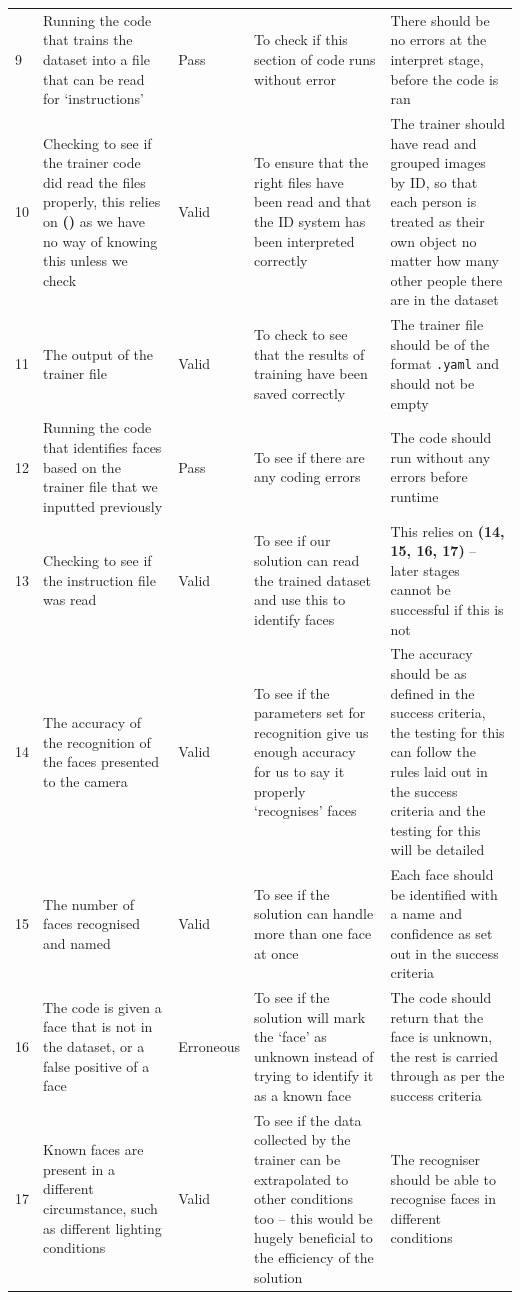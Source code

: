 \documentclass[9pt]{article}
\begin{document}
\begin{tabularx}{\textwidth}{lXlXX}
	9   & Running the code that trains the dataset into a file that can be read for `instructions' & Pass & To check if this section of code runs without error & There should be no errors at the interpret stage, before the code is ran \\
	10  & Checking to see if the trainer code did read the files properly, this relies on \textbf{()} as we have no way of knowing this unless we check & Valid & To ensure that the right files have been read and that the ID system has been interpreted correctly & The trainer should have read and grouped images by ID, so that each person is treated as their own object no matter how many other people there are in the dataset\\
	11  & The output of the trainer file & Valid & To check to see that the results of training have been saved correctly & The trainer file should be of the format \texttt{.yaml} and should not be empty \\
	12  & Running the code that identifies faces based on the trainer file that we inputted previously & Pass & To see if there are any coding errors & The code should run without any errors before runtime \\
	13  & Checking to see if the instruction file was read & Valid & To see if our solution can read the trained dataset and use this to identify faces & This relies on \textbf{(14, 15, 16, 17)} -- later stages cannot be successful if this is not \\
	14  & The accuracy of the recognition of the faces presented to the camera & Valid & To see if the parameters set for recognition give us enough accuracy for us to say it properly `recognises' faces & The accuracy should be as defined in the success criteria, the testing for this can follow the rules laid out in the success criteria and the testing for this will be detailed \\ 
	15 & The number of faces recognised and named & Valid & To see if the solution can handle more than one face at once & Each face should be identified with a name and confidence as set out in the success criteria	\\
	16 & The code is given a face that is not in the dataset, or a false positive of a face & Erroneous & To see if the solution will mark the `face' as unknown instead of trying to identify it as a known face & The code should return that the face is unknown, the rest is carried through as per the success criteria \\
	17 & Known faces are present in a different circumstance, such as different lighting conditions & Valid & To see if the data collected by the trainer can be extrapolated to other conditions too -- this would be hugely beneficial to the efficiency of the solution & The recogniser should be able to recognise faces in different conditions \\

\end{tabularx}
\end{document}
